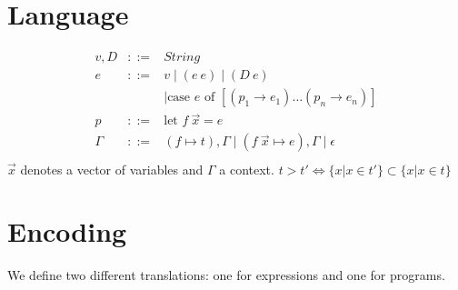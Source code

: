 \documentclass{article}
\begin{document}
\section{Language}

\newcommand{\unr}{\texttt{UNR}}
\newcommand{\bad}{\texttt{BAD}}
\newcommand{\any}{\texttt{Any}}
\newcommand{\ok}{\texttt{Ok}}

\begin{eqnarray*}
  v,D &::=& String \\
  e &::=& v \mid (e~e) \mid (D~e) \\
  &&\mid \mbox{case $e$ of } [(p_1 \to e_1) \dots (p_n \to e_n)]    \\ 
  p &::=& \mbox{let } f~\vec{x} = e \\
  \Gamma &::=& (f \mapsto t),\Gamma \mid (f~\vec{x} \mapsto e), \Gamma \mid \epsilon\\
\end{eqnarray*}
$\vec{x}$ denotes a vector of variables and $\Gamma$ a context.
$t > t' \iff \{ x | x \in t' \} \subset \{ x | x \in t \}$
\section{Encoding}

We define two different translations: one for expressions and one for programs.
\end{document}
